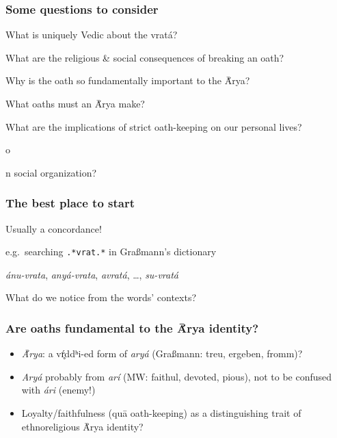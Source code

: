 \documentclass[pdf]{beamer}
\newcommand{\Subitem}[1]{{\setlength\itemindent{12pt} \item[-] #1}}
\begin{document}
\begin{frame} \frametitle{Some questions to consider}
\begin{itemize}
	\item What is uniquely Vedic about the vratá?
	\item What are the religious \& social consequences of breaking an oath?
	\item Why is the oath so fundamentally important to the Ā́rya?
	\item What oaths must an Ā́rya make?
	\item What are the implications of strict oath-keeping on our personal lives?
	\Subitem on social organization?
\end{itemize}
\end{frame}

\begin{frame} \frametitle{The best place to start}
\begin{itemize}
	\item Usually a concordance!
	\item e.g.~searching \texttt{.*vrat.*} in Graßmann's dictionary
	\Subitem {\textit{ánu-vrata}, \textit{anyá-vrata}, \textit{avratá}, \ldots, \textit{su-vratá}}
	\item What do we notice from the words' contexts?
\end{itemize}
\end{frame}

\begin{frame} \frametitle{Are oaths fundamental to the Ā́rya identity?}
\begin{itemize}
	\item \textit{Ā́rya}: a vŕ̥ddʰi-ed form of \textit{aryá} (Graßmann: treu, ergeben, fromm)?
	\pause \item \textit{Aryá} probably from \textit{arí} (MW: faithul, devoted, pious), not to be confused with \textit{ári} (enemy!)
	\pause \item Loyalty/faithfulness (quā oath-keeping) as a distinguishing trait of ethnoreligious Ā́rya identity?
\end{itemize}
\end{frame}
\end{document}
